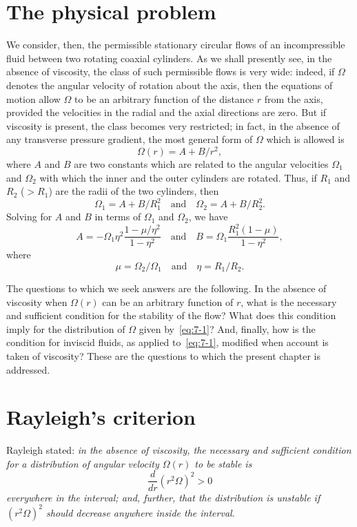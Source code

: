 \section{The physical problem}\label{sec:7-65}
We consider, then, the permissible stationary circular flows of an
incompressible fluid between two rotating coaxial cylinders.  As we shall
presently see, in the absence of viscosity, the class of such permissible
flows is very wide: indeed, if $\Omega$ denotes the angular velocity of rotation
about the axis, then the equations of motion allow $\Omega$ to be an arbitrary
function of the distance $r$ from the axis, provided the velocities in the
radial and the axial directions are zero.  But if viscosity is present, the
class becomes very restricted; in fact, in the absence of any transverse
pressure gradient, the most general form of $\Omega$ which is allowed is
\begin{equation}
\label{eq:7-1}
\Omega(r) = A + B/r^2,
\end{equation}
where $A$ and $B$ are two constants which are related to the angular
velocities $\Omega_1$ and $\Omega_2$ with which the inner and the outer cylinders are
rotated.  Thus, if $R_1$ and $R_2$ ($> R_1$) are the radii of the two cylinders,
then
\begin{equation}
\label{eq:7-2}
\Omega_1 = A + B/R_1^2 \quad \text{and} \quad \Omega_2 = A + B/R_2^2.
\end{equation}
Solving for $A$ and $B$ in terms of $\Omega_1$ and $\Omega_2$, we have
\begin{equation}
\label{eq:7-3}
A = -\Omega_1 \eta^2 \frac{1-\mu/\eta^2}{1-\eta^2} \quad \text{and} \quad
B = \Omega_1 \frac{R_1^2(1-\mu)}{1-\eta^2},
\end{equation}
where
\begin{equation}
\label{eq:7-4}
\mu = \Omega_2/\Omega_1 \quad \text{and} \quad \eta = R_1/R_2.
\end{equation}

The questions to which we seek answers are the following.  In the
absence of viscosity when $\Omega(r)$ can be an arbitrary function of $r$, what is
the necessary and sufficient condition for the stability of the flow?
What does this condition imply for the distribution of $\Omega$ given by~\eqref{eq:7-1}?
And, finally, how is the condition for inviscid fluids, as applied to~\eqref{eq:7-1},
modified when account is taken of viscosity?  These are the questions
to which the present chapter is addressed.

\section{Rayleigh's criterion}\label{sec:7-66}
Rayleigh stated: \emph{in the absence of viscosity, the necessary and sufficient
condition for a distribution of angular velocity $\Omega(r)$ to be stable is}
\begin{equation}
\label{eq:7-5}
\frac{d}{dr}(r^2\Omega)^2 > 0
\end{equation}
\emph{everywhere in the interval; and, further, that the distribution is unstable if
$(r^2\Omega)^2$ should decrease anywhere inside the interval.}

